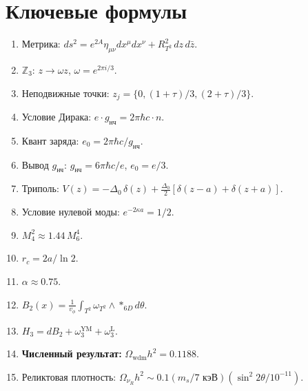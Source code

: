 \documentclass[11pt,letterpaper]{article}
\begin{document}
\section{Ключевые формулы}
\begin{enumerate}
\item Метрика: $ds^2 = e^{2A}\eta_{\mu\nu}dx^\mu dx^\nu + R_{T^2}^2 \, dz \, d\bar{z}$.
\item $\mathbb{Z}_3$: $z \to \omega z$, $\omega = e^{2\pi i/3}$.
\item Неподвижные точки: $z_j = \{0, (1+\tau)/3, (2+\tau)/3\}$.
\item Условие Дирака: $e \cdot g_{\text{нч}} = 2\pi \hbar c \cdot n$.
\item Квант заряда: $e_0 = 2\pi\hbar c/g_{\text{нч}}$.
\item Вывод $g_{\text{нч}}$: $g_{\text{нч}} = 6\pi\hbar c/e$, $e_0 = e/3$.
\item Триполь: $V(z) = -\Delta_0 \, \delta(z) + \frac{\Delta_0}{2} [\delta(z - a) + \delta(z + a)]$.
\item Условие нулевой моды: $e^{-2\kappa a} = 1/2$.
\item $M_4^2 \approx 1.44 \, M_6^4$.
\item $r_c = 2a/\ln 2$.
\item $\alpha \approx 0.75$.
\item $B_2(x) = \frac{1}{v_\phi} \int_{T^2} \omega_{T^2} \wedge *_{6D} d\theta$.
\item $H_3 = dB_2 + \omega_3^{\text{YM}} + \omega_3^{\text{L}}$.
\item \textbf{Численный результат:} $\Omega_{\text{wdm}} h^2 = 0.1188$.
\item Реликтовая плотность: $\Omega_{\nu_R} h^2 \sim 0.1 (m_s/7 \text{ кэВ})(\sin^2 2\theta/10^{-11})$.
\end{enumerate}
\end{document}

